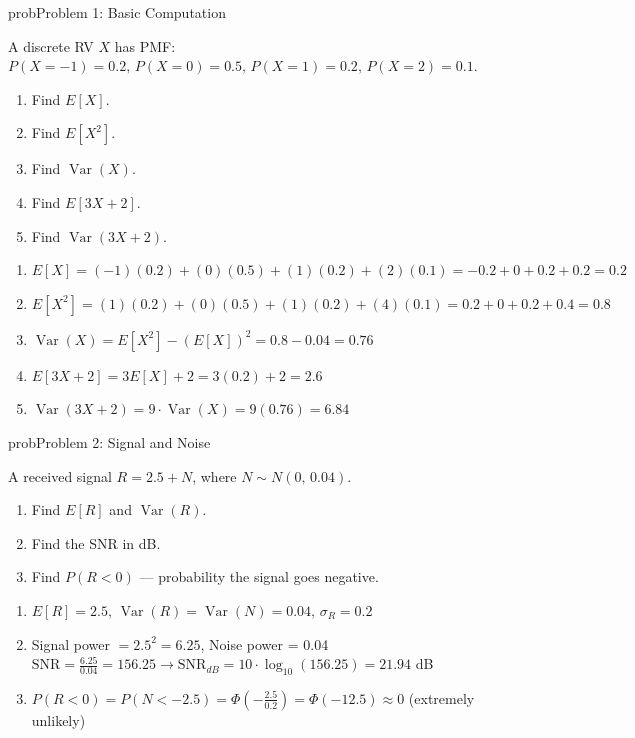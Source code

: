 \begin{PSbox}[unbreakable]{prob}{Problem 1: Basic Computation}

A discrete RV $X$ has PMF: $P(X = -1) = 0.2,\, P(X = 0) = 0.5,\, P(X = 1) = 0.2,\, P(X = 2) = 0.1$.

\begin{enumerate}
\def\labelenumi{(\alph{enumi})}
\tightlist
\item
  Find $E[X]$.
\item
  Find $E[X^{2}]$.
\item
  Find $\operatorname{Var}(X)$.
\item
  Find $E[3X + 2]$.
\item
  Find $\operatorname{Var}(3X + 2)$.
\end{enumerate}

\PSsolution{} 

\begin{enumerate}
\def\labelenumi{(\alph{enumi})}
\item
  $E[X] = (-1)(0.2) + (0)(0.5) + (1)(0.2) + (2)(0.1) = -0.2 + 0 + 0.2 + 0.2 = 0.2$
\item
  $E[X^{2}] = (1)(0.2) + (0)(0.5) + (1)(0.2) + (4)(0.1) = 0.2 + 0 + 0.2 + 0.4 = 0.8$
\item
  $\operatorname{Var}(X) = E[X^{2}] - (E[X])^{2} = 0.8 - 0.04 = 0.76$
\item
  $E[3X + 2] = 3E[X] + 2 = 3(0.2) + 2 = 2.6$
\item
  $\operatorname{Var}(3X + 2) = 9 \cdot \operatorname{Var}(X) = 9(0.76) = 6.84$
\end{enumerate}

\end{PSbox}

\begin{PSbox}[unbreakable]{prob}{Problem 2: Signal and Noise}

A received signal $R = 2.5 + N$, where $N \sim N(0,\, 0.04)$.

\begin{enumerate}
\def\labelenumi{(\alph{enumi})}
\tightlist
\item
  Find $E[R]$ and $\operatorname{Var}(R)$.
\item
  Find the SNR in dB.
\item
  Find $P(R < 0)$ — probability the signal goes negative.
\end{enumerate}

\PSsolution{} 

\begin{enumerate}
\def\labelenumi{(\alph{enumi})}
\item
  $E[R] = 2.5,\, \operatorname{Var}(R) = \operatorname{Var}(N) = 0.04,\, \sigma_{R} = 0.2$
\item
  Signal power $= 2.5^{2} = 6.25$, Noise power = 0.04\PSbr{}$\mathrm{SNR} = \frac{6.25}{0.04} = 156.25 \to \mathrm{SNR}_{dB} = 10 \cdot \log_{10}(156.25) = 21.94$ dB
\item
  $P(R < 0) = P(N < -2.5) = \Phi \left(-\frac{2.5}{0.2}\right) = \Phi (-12.5) \approx 0$ (extremely unlikely)
\end{enumerate}

\end{PSbox}

